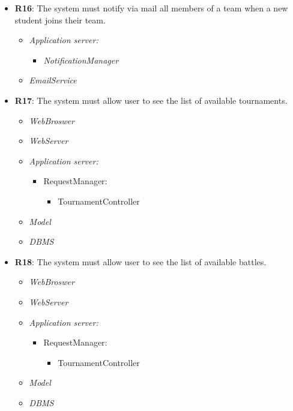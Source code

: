 \begin{itemize}
        
        \item \textbf{R16}: The system must notify via mail all members of a team when a new student joins their team.
            \begin{itemize}
                 \item \textit{Application server:}\begin{itemize}
                     \item \textit{NotificationManager}
                 \end{itemize}
                \item \textit{EmailService}
                \end{itemize}
            
        
        \item \textbf{R17}: The system must allow user to see the list of available tournaments.
            \begin{itemize}
                \item \textit{WebBroswer}
                \item \textit{WebServer}
                \item \textit{Application server:}\begin{itemize}
                    \item RequestManager:\begin{itemize}
                        \item TournamentController
                    \end{itemize}
                \end{itemize}
                \item \textit{Model}
                \item \textit{DBMS}
                \end{itemize}


     \item \textbf{R18}: The system must allow user to see the list of available battles.
           \begin{itemize}
                 \item \textit{WebBroswer}
                \item \textit{WebServer}
                \item \textit{Application server:}\begin{itemize}
                    \item RequestManager:\begin{itemize}
                        \item TournamentController
                    \end{itemize}
                \end{itemize}
                \item \textit{Model}
                \item \textit{DBMS}
                \end{itemize}
        

\end{itemize}
